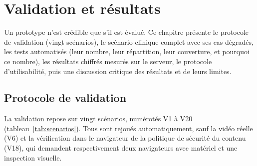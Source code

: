 \chapter{Validation et résultats}
\label{chap:validation}

\introchap

Un prototype n'est crédible que s'il est évalué. Ce chapitre présente le protocole de validation (vingt scénarios), le scénario clinique complet avec ses cas dégradés, les tests automatisés (leur nombre, leur répartition, leur couverture, et pourquoi ce nombre), les résultats chiffrés mesurés sur le serveur, le protocole d'utilisabilité, puis une discussion critique des résultats et de leurs limites.

\section{Protocole de validation}

La validation repose sur vingt scénarios, numérotés V1 à V20 (tableau~\ref{tab:scenarios}). Tous sont rejoués automatiquement, sauf la vidéo réelle (V6) et la vérification dans le navigateur de la politique de sécurité du contenu (V18), qui demandent respectivement deux navigateurs avec matériel et une inspection visuelle.

